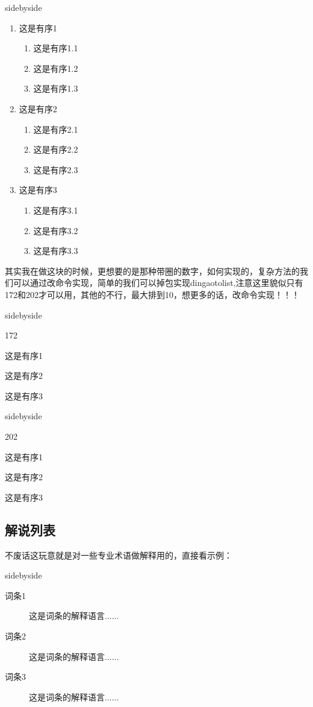 \documentclass[cn,chinese,color=cyan]{elegantbook}
\begin{document}
\begin{tcblisting}{sidebyside}
\begin{enumerate}
\item 这是有序1
\begin{enumerate}
\item  这是有序1.1
\item  这是有序1.2
\item  这是有序1.3
\end{enumerate}
\item 这是有序2
\begin{enumerate}
\item  这是有序2.1
\item  这是有序2.2
\item  这是有序2.3
\end{enumerate}
\item 这是有序3
\begin{enumerate}
\item  这是有序3.1
\item  这是有序3.2
\item  这是有序3.3
\end{enumerate}
\end{enumerate}
\end{tcblisting}
\begin{note}
	其实我在做这块的时候，更想要的是那种带圈的数字，如何实现的，复杂方法的我们可以通过改命令实现，简单的我们可以掉包实现dingaotolist,注意这里貌似只有172和202才可以用，其他的不行，最大排到10，想更多的话，改命令实现！！！
\end{note}
\begin{tcblisting}{sidebyside}
\begin{dingautolist}{172}
\item  这是有序1
\item  这是有序2
\item  这是有序3
\end{dingautolist}
\end{tcblisting}
\begin{tcblisting}{sidebyside}
\begin{dingautolist}{202}
\item  这是有序1
\item  这是有序2
\item  这是有序3
\end{dingautolist}
\end{tcblisting}
\subsection{解说列表}
不废话这玩意就是对一些专业术语做解释用的，直接看示例：
\begin{tcblisting}{sidebyside}
\begin{description}
\item[词条1] 这是词条的解释语言......
\item[词条2] 这是词条的解释语言......
\item[词条3] 这是词条的解释语言......
\end{description}
\end{tcblisting}
\end{document}

